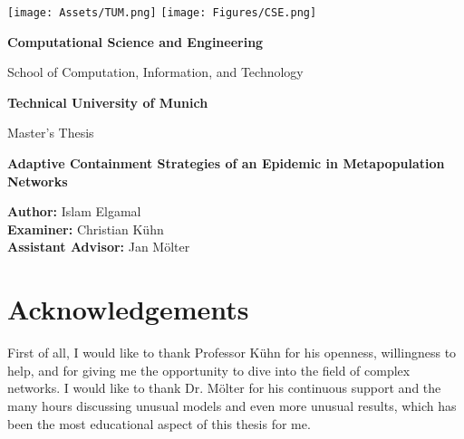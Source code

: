 
% 
\begin{titlepage}
    \centering
    \vspace*{1cm}
    
    \texttt{[image: Assets/TUM.png]}
    \hspace{.5cm}
    \texttt{[image: Figures/CSE.png]}
    
    \vspace{.25cm}
    \LARGE
    \textbf{Computational Science and Engineering}
    
    \vspace{.5cm}
    \Large
    School of Computation, Information, and Technology
    
    \vspace{1.5cm}
    
    \textbf{Technical University of Munich}
    
    \vspace{2cm}
    
    \Large
    Master's Thesis
    
    \vspace{0.5cm}
    
    \textbf{Adaptive Containment Strategies of an Epidemic in Metapopulation Networks}
    
    \vspace{2cm}
    
    \Large
    \textbf{Author:}    Islam Elgamal\\
    \textbf{Examiner:}    Christian Kühn\\
    \textbf{Assistant Advisor:}    Jan Mölter

    \vspace{2cm}
    
    
\end{titlepage}
\newpage

\section*{Acknowledgements}
First of all, I would like to thank Professor Kühn for his openness, willingness to help, and for giving me the opportunity to dive into the field of complex networks. I would like to thank Dr. Mölter for his continuous support and the many hours discussing unusual models and even more unusual results, which has been the most educational aspect of this thesis for me. \\

